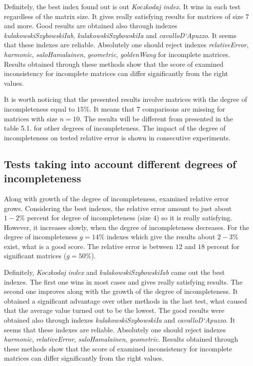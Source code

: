 Definitely, the best index found out is out \textit{Koczkodaj index}. It wins in each test regardless of the matrix size. It gives really satisfying results for matrices of size $7$ and more. Good results are obtained also through indexes \textit{kulakowskiSzybowskiIab}, \textit{kulakowskiSzybowskiIa} and \textit{cavalloD`Apuzzo}. It seems that these indexes are reliable. Absolutely one should reject indexes \textit{relativeError}, \textit{harmonic}, \textit{saloHamalainen}, \textit{geometric}, \textit{goldenWang} for incomplete matrices. Results obtained through these methods show that the score of examined inconsistency for incomplete matrices can differ significantly from the right values.

It is worth noticing that the presented results involve matrices with the degree of incompleteness equal to $15\%$. It means that $7$ comparisons are missing for matrices with size $n = 10$. The results will be different from presented in the table 5.1. for other degrees of incompleteness. The impact of the degree of incompleteness on tested relative error is shown in consecutive experiments.

\subsection{Tests taking into account different degrees of incompleteness}
Along with growth of the degree of incompleteness, examined relative error grows. Considering the best indexes, the relative error amount to just about $1 - 2\%$ percent for degree of incompleteness (size $4$) so it is really satisfying. However, it increases slowly, when the degree of incompleteness decreases. For the degree of incompleteness $g=14\%$ indexes which give the results about $2 - 3 \%$ exist, what is a good score. The relative error is between $12$ and $18$ percent for significant matrices ($g=50\%$).

Definitely, \textit{Koczkodaj index} and \textit{kulakowskiSzybowskiIab} came out the best indexes. The first one wins in most cases and gives really satisfying results. The second one improves along with the growth of the degree of incompleteness. It obtained a significant advantage over other methods in the last test, what caused that the average value turned out to be the lowest. 
The good results were obtained also through indexes \textit{kulakowskiSzybowskiIa} and \textit{cavalloD`Apuzzo}. It seems that these indexes are reliable. Absolutely one should reject indexes \textit{harmonic}, \textit{relativeError}, \textit{saloHamalainen}, \textit{geometric}. Results obtained through these methods show that the score of examined inconsistency for incomplete matrices can differ significantly from the right values.

